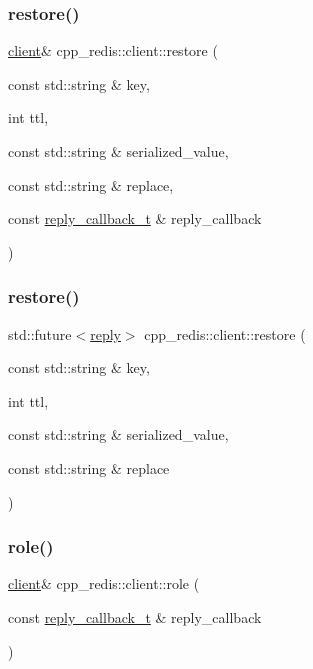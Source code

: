 \subsubsection{\texorpdfstring{restore()}{restore()}\hspace{0.1cm}{\footnotesize\ttfamily [3/4]}}
{\footnotesize\ttfamily \hyperlink{classcpp__redis_1_1client}{client}\& cpp\+\_\+redis\+::client\+::restore (\begin{DoxyParamCaption}\item[{const std\+::string \&}]{key,  }\item[{int}]{ttl,  }\item[{const std\+::string \&}]{serialized\+\_\+value,  }\item[{const std\+::string \&}]{replace,  }\item[{const \hyperlink{classcpp__redis_1_1client_a061a1140d36d2eaeda82b09a0bb3f9f2}{reply\+\_\+callback\+\_\+t} \&}]{reply\+\_\+callback }\end{DoxyParamCaption})}

\mbox{\label{classcpp__redis_1_1client_a15b2c81c1d5b86f3490ecfb154b29ad1}} 
\subsubsection{\texorpdfstring{restore()}{restore()}\hspace{0.1cm}{\footnotesize\ttfamily [4/4]}}
{\footnotesize\ttfamily std\+::future$<$\hyperlink{classcpp__redis_1_1reply}{reply}$>$ cpp\+\_\+redis\+::client\+::restore (\begin{DoxyParamCaption}\item[{const std\+::string \&}]{key,  }\item[{int}]{ttl,  }\item[{const std\+::string \&}]{serialized\+\_\+value,  }\item[{const std\+::string \&}]{replace }\end{DoxyParamCaption})}

\mbox{\label{classcpp__redis_1_1client_a73bc7e0a747d437e5f9ac233a152c9bc}} 
\subsubsection{\texorpdfstring{role()}{role()}\hspace{0.1cm}{\footnotesize\ttfamily [1/2]}}
{\footnotesize\ttfamily \hyperlink{classcpp__redis_1_1client}{client}\& cpp\+\_\+redis\+::client\+::role (\begin{DoxyParamCaption}\item[{const \hyperlink{classcpp__redis_1_1client_a061a1140d36d2eaeda82b09a0bb3f9f2}{reply\+\_\+callback\+\_\+t} \&}]{reply\+\_\+callback }\end{DoxyParamCaption})}

